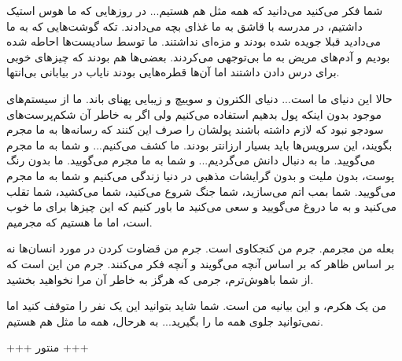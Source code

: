 \begin{mdframed}
شما فکر می‌کنید می‌دانید که همه مثل هم هستیم... در روزهایی که ما هوس استیک داشتیم، در مدرسه با قاشق به ما غذای بچه می‌دادند. تکه گوشت‌هایی که به ما می‌دادید قبلا جویده شده بودند و مزه‌ای نداشتند. ما توسط سادیست‌ها احاطه شده بودیم و آدم‌های مریض به ما بی‌توجهی می‌کردند. بعضی‌ها هم بودند که چیزهای خوبی برای درس دادن داشتند اما آن‌ها قطره‌هایی بودند نایاب در بیابانی بی‌انتها.

حالا این دنیای ما است... دنیای الکترون و سوییچ و زیبایی پهنای باند. ما از سیستم‌های موجود بدون اینکه پول بدهیم استفاده می‌کنیم ولی اگر به خاطر آن شکم‌پرست‌های سودجو نبود که لازم داشته باشند پولشان را صرف این کنند که رسانه‌ها به ما مجرم بگویند، این سرویس‌ها باید بسیار ارزانتر بودند. ما کشف می‌کنیم... و شما به ما مجرم می‌گویید. ما به دنبال دانش می‌گردیم... و شما به ما مجرم می‌گویید. ما بدون رنگ پوست، بدون ملیت و بدون گرایشات مذهبی در دنیا زندگی می‌کنیم و شما به ما مجرم می‌گویید. شما بمب اتم می‌سازید، شما جنگ شروع می‌کنید، شما می‌کشید، شما تقلب می‌کنید و به ما دروغ می‌گویید و سعی می‌کنید ما باور کنیم که این چیزها برای ما خوب است، اما ما هستیم که مجرمیم.

بعله من مجرمم. جرم من کنجکاوی است. جرم من قضاوت کردن در مورد انسان‌ها نه بر اساس ظاهر که بر اساس آنچه می‌گویند و آنچه فکر می‌کنند. جرم من این است که از شما باهوش‌ترم، جرمی که هرگز به خاطر آن مرا نخواهید بخشید.

من یک هکرم، و این بیانیه من است. شما شاید بتوانید این یک نفر را متوقف کنید اما نمی‌توانید جلوی همه ما را بگیرید... به هرحال، همه ما مثل هم هستیم.
\begin{flushleft}
	+++ منتور +++
\end{flushleft}
\end{mdframed}
